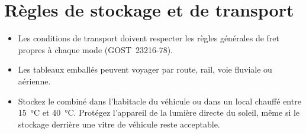 \chapter{Règles de stockage et de transport}\label{ch:storage}

\begin{itemize}
    \item Les conditions de transport doivent respecter les règles générales de fret propres à chaque mode (GOST~23216-78).
    \item Les tableaux emballés peuvent voyager par route, rail, voie fluviale ou aérienne.
    \item Stockez le combiné dans l'habitacle du véhicule ou dans un local chauffé entre \SI{15}{\celsius} et \SI{40}{\celsius}. Protégez l'appareil de la lumière directe du soleil, même si le stockage derrière une vitre de véhicule reste acceptable.
\end{itemize}
